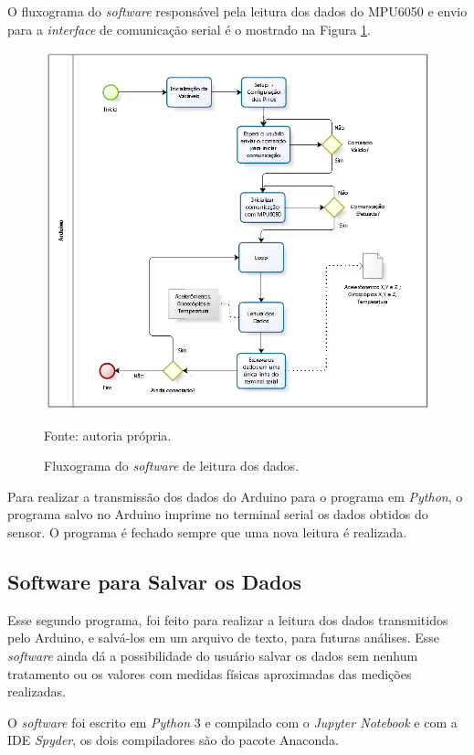 		O fluxograma do \textit{software} responsável pela leitura dos dados do MPU6050 e envio para a \textit{interface} de comunicação serial é o mostrado na Figura \ref{fluxograma_arduino}. 
		
		\begin{figure}[h]
			\centering
			\includegraphics[keepaspectratio=true,scale=0.9]{figuras/diagrama_embarcado.PNG}
			\caption{Fluxograma do \textit{software} de leitura dos dados. }
			Fonte: autoria própria. 
			\label{fluxograma_arduino}	
		\end{figure}
		
		Para realizar a transmissão dos dados do Arduino para o programa em \textit{Python}, o programa salvo no Arduino imprime no terminal serial os dados obtidos do sensor. O programa é fechado sempre que uma nova leitura é realizada.
		 
\subsection{Software para Salvar os Dados}
		Esse segundo programa, foi feito para realizar a leitura dos dados transmitidos pelo Arduino, e salvá-los em um arquivo de texto, para futuras análises. Esse \textit{software} ainda dá a possibilidade do usuário salvar os dados sem nenhum tratamento ou os valores com medidas físicas aproximadas das medições realizadas. 
		
		O \textit{software} foi escrito em \textit{Python} 3 e compilado com o \textit{Jupyter Notebook} e com a IDE \textit{Spyder}, os dois compiladores são do pacote Anaconda. 
		
